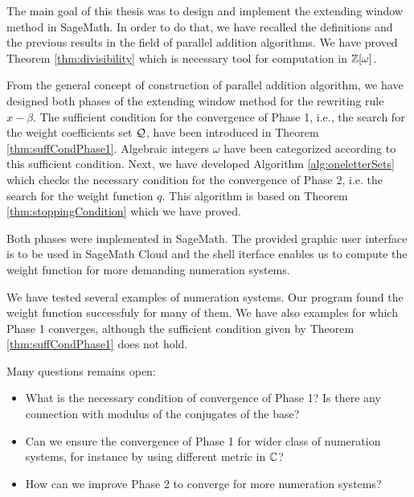 The main goal of this thesis was to design and implement the extending window method in SageMath. In order to do that, we have recalled the definitions and the previous results in the field of parallel addition algorithms. We have proved Theorem \ref{thm:divisibility} which is necessary tool for computation in $\mathbb{Z}[\omega]$.

From the general concept of construction of parallel addition algorithm, we have designed both phases of the extending window method for the rewriting rule $x-\beta$. The sufficient condition for the convergence of Phase 1, i.e., the search for the weight coefficients set $\mathcal{Q}$, have been introduced in Theorem \ref{thm:suffCondPhase1}. Algebraic integers $\omega$ have been categorized according to this sufficient condition. Next, we have developed Algorithm \ref{alg:oneletterSets} which checks the necessary condition for the convergence of Phase 2, i.e. the search for the weight function $q$. This algorithm is based on Theorem \ref{thm:stoppingCondition} which we have proved.

Both phases were implemented in SageMath. The provided graphic user interface is  to be used in SageMath Cloud and the shell iterface enables us to compute the weight function for more demanding numeration systems.

We have tested several examples of numeration systems. Our program found the weight function successfuly for many of them. We have also examples for which Phase 1 converges, although the sufficient condition given by Theorem \ref{thm:suffCondPhase1} does not hold. 

Many questions remains open:
\begin{itemize}
\item What is the necessary condition of convergence of Phase 1? Is there any connection with modulus of the conjugates of the base?
\item Can we ensure the convergence of Phase 1 for wider class of numeration systems, for instance by using different metric in $\mathbb{C}$?
\item How can we improve Phase 2 to converge for more numeration systems?
\end{itemize}
